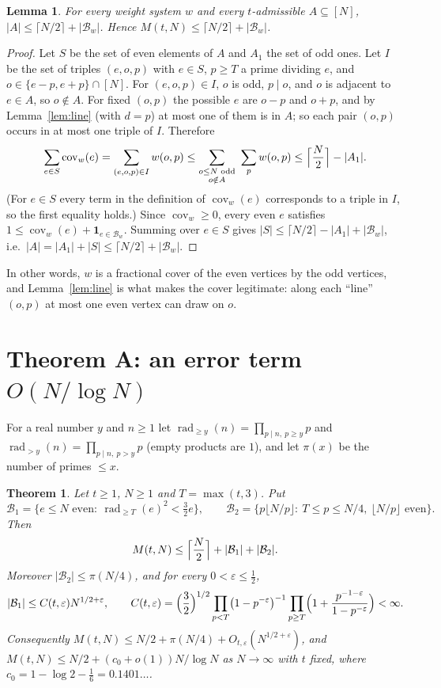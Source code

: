 \documentclass[11pt]{amsart}
\newtheorem{theorem}{Theorem}
\newtheorem{lemma}{Lemma}[section]
\theoremstyle{definition}
\theoremstyle{remark}
\newcommand{\rad}{\operatorname{rad}}
\newcommand{\cov}{\operatorname{cov}}
\newcommand{\Bad}{\mathcal{B}}
\begin{document}
\begin{lemma}\label{lem:weights}
For every weight system $w$ and every $t$-admissible $A\subseteq[N]$, $|A|\le\lceil N/2\rceil+|\Bad_w|$. Hence $M(t,N)\le\lceil N/2\rceil+|\Bad_w|$.
\end{lemma}

\begin{proof}
Let $S$ be the set of even elements of $A$ and $A_1$ the set of odd ones. Let $I$ be the set of triples $(e,o,p)$ with $e\in S$, $p\ge T$ a prime dividing $e$, and $o\in\{e-p,e+p\}\cap[N]$. For $(e,o,p)\in I$, $o$ is odd, $p\mid o$, and $o$ is adjacent to $e\in A$, so $o\notin A$. For fixed $(o,p)$ the possible $e$ are $o-p$ and $o+p$, and by Lemma~\ref{lem:line} (with $d=p$) at most one of them is in $A$; so each pair $(o,p)$ occurs in at most one triple of $I$. Therefore
\[
\sum_{e\in S}\cov_w(e)=\sum_{(e,o,p)\in I}w(o,p)\le\sum_{\substack{o\le N\text{ odd}\\ o\notin A}}\ \sum_{p}w(o,p)\le\Bigl\lceil\frac N2\Bigr\rceil-|A_1|.
\]
(For $e\in S$ every term in the definition of $\cov_w(e)$ corresponds to a triple in $I$, so the first equality holds.) Since $\cov_w\ge0$, every even $e$ satisfies $1\le\cov_w(e)+\mathbf 1_{e\in\Bad_w}$. Summing over $e\in S$ gives $|S|\le\lceil N/2\rceil-|A_1|+|\Bad_w|$, i.e.\ $|A|=|A_1|+|S|\le\lceil N/2\rceil+|\Bad_w|$.
\end{proof}

In other words, $w$ is a fractional cover of the even vertices by the odd vertices, and Lemma~\ref{lem:line} is what makes the cover legitimate: along each ``line'' $(o,p)$ at most one even vertex can draw on $o$.

\section{\texorpdfstring{Theorem A: an error term $O(N/\log N)$}{Theorem A: an error term O(N/log N)}}

For a real number $y$ and $n\ge1$ let $\rad_{\ge y}(n)=\prod_{p\mid n,\ p\ge y}p$ and $\rad_{>y}(n)=\prod_{p\mid n,\ p>y}p$ (empty products are $1$), and let $\pi(x)$ be the number of primes $\le x$.

\begin{theorem}\label{thm:A}
Let $t\ge1$, $N\ge1$ and $T=\max(t,3)$. Put
\[
\Bad_1=\{e\le N\text{ even}:\ \rad_{\ge T}(e)^2<\tfrac32 e\},\qquad
\Bad_2=\{p\lfloor N/p\rfloor:\ T\le p\le N/4,\ \lfloor N/p\rfloor\text{ even}\}.
\]
Then
\begin{equation}\label{eq:A}
M(t,N)\le\Bigl\lceil\frac N2\Bigr\rceil+|\Bad_1|+|\Bad_2|.
\end{equation}
Moreover $|\Bad_2|\le\pi(N/4)$, and for every $0<\varepsilon\le\tfrac12$,
\[
|\Bad_1|\le C(t,\varepsilon)N^{1/2+\varepsilon},\qquad
C(t,\varepsilon)=\Bigl(\frac32\Bigr)^{1/2}\prod_{p<T}\bigl(1-p^{-\varepsilon}\bigr)^{-1}\prod_{p\ge T}\Bigl(1+\frac{p^{-1-\varepsilon}}{1-p^{-\varepsilon}}\Bigr)<\infty.
\]
Consequently $M(t,N)\le N/2+\pi(N/4)+O_{t,\varepsilon}(N^{1/2+\varepsilon})$, and $M(t,N)\le N/2+(c_0+o(1))N/\log N$ as $N\to\infty$ with $t$ fixed, where $c_0=1-\log2-\frac16=0.1401\ldots$.
\end{theorem}
\end{document}
